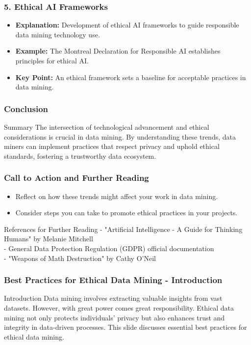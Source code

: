 \documentclass{beamer}
\begin{document}
\begin{frame}[fragile]
    \frametitle{5. Ethical AI Frameworks}
    \begin{itemize}
        \item \textbf{Explanation:} Development of ethical AI frameworks to guide responsible data mining technology use.
        \item \textbf{Example:} The Montreal Declaration for Responsible AI establishes principles for ethical AI.
        \item \textbf{Key Point:} An ethical framework sets a baseline for acceptable practices in data mining.
    \end{itemize}
\end{frame}

\begin{frame}[fragile]
    \frametitle{Conclusion}
    \begin{block}{Summary}
        The intersection of technological advancement and ethical considerations is crucial in data mining. By understanding these trends, data miners can implement practices that respect privacy and uphold ethical standards, fostering a trustworthy data ecosystem.
    \end{block}
\end{frame}

\begin{frame}[fragile]
    \frametitle{Call to Action and Further Reading}
    \begin{itemize}
        \item Reflect on how these trends might affect your work in data mining.
        \item Consider steps you can take to promote ethical practices in your projects.
    \end{itemize}
    \begin{block}{References for Further Reading}
        - "Artificial Intelligence - A Guide for Thinking Humans" by Melanie Mitchell \\
        - General Data Protection Regulation (GDPR) official documentation \\
        - "Weapons of Math Destruction" by Cathy O'Neil
    \end{block}
\end{frame}

\begin{frame}[fragile]
    \frametitle{Best Practices for Ethical Data Mining - Introduction}
    \begin{block}{Introduction}
        Data mining involves extracting valuable insights from vast datasets. However, with great power comes great responsibility. Ethical data mining not only protects individuals' privacy but also enhances trust and integrity in data-driven processes. This slide discusses essential best practices for ethical data mining.
    \end{block}
\end{frame}
\end{document}
